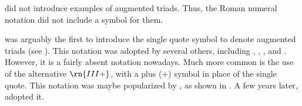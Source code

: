 
\textcite{weber1817versuch} did not introduce examples of
augmented triads. Thus, the Roman numeral notation did not
include a symbol for them. 

\textcite{richter1860lehrbuch} was arguably the first to
introduce the single quote symbol to denote augmented triads
(see ). This
notation was adopted by several others, including
\textcite{jadassohn1883lehrbuch},
\textcite{broekhoven1889system}, \textcite{buwa1893schule},
and \textcite{shepard1896harmony}. However, it is a fairly
absent notation nowadays. Much more common is the use of the
alternative $\rn{III+}$, with a plus ($+$) symbol in place
of the single quote. This notation was maybe popularized by
\textcite{riemann1890katechismus}, as shown in
. A few
years later, \textcite{chadwick1897harmony} adopted it. 


